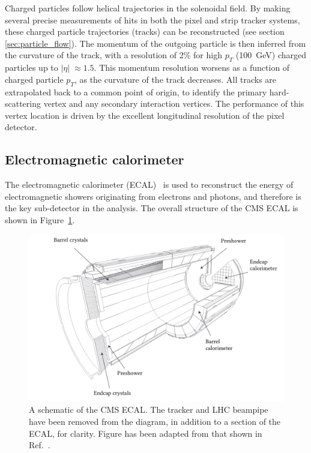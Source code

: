 Charged particles follow helical trajectories in the solenoidal field. By making several precise measurements of hits in both the pixel and strip tracker systems, these charged particle trajectories (tracks) can be reconstructed (see section \ref{sec:particle_flow}). 
The momentum of the outgoing particle is then inferred from the curvature of the track, with a resolution of 2\% for high $p_T$ (100~GeV) charged particles up to $|\eta|\;\approx1.5$. This momentum resolution worsens as a function of charged particle $p_T$, as the curvature of the track decreases. All tracks are extrapolated back to a common point of origin, to identify the primary hard-scattering vertex and any secondary interaction vertices. The performance of this vertex location is driven by the excellent longitudinal resolution of the pixel detector.

\subsection{Electromagnetic calorimeter}\label{sec:cms_ecal}
The electromagnetic calorimeter (ECAL)~\cite{Chatrchyan:2008zzk,Benaglia:1632384,CMS:1997ysd} is used to reconstruct the energy of electromagnetic showers originating from electrons and photons, and therefore is the key sub-detector in the \Hgg analysis. The overall structure of the CMS ECAL is shown in Figure~\ref{fig:cms_ecal}. 

\begin{figure}[htb!]
  \centering
  \includegraphics[width=1\textwidth]{Figures/cms/ecal.pdf}
  \caption[The CMS electromagnetic calorimeter]
  {
    A schematic of the CMS ECAL. The tracker and LHC beampipe have been removed from the diagram, in addition to a section of the ECAL, for clarity. Figure has been adapted from that shown in Ref.~\cite{Chatrchyan:2008zzk}.
  }
  \label{fig:cms_ecal}
\end{figure}

